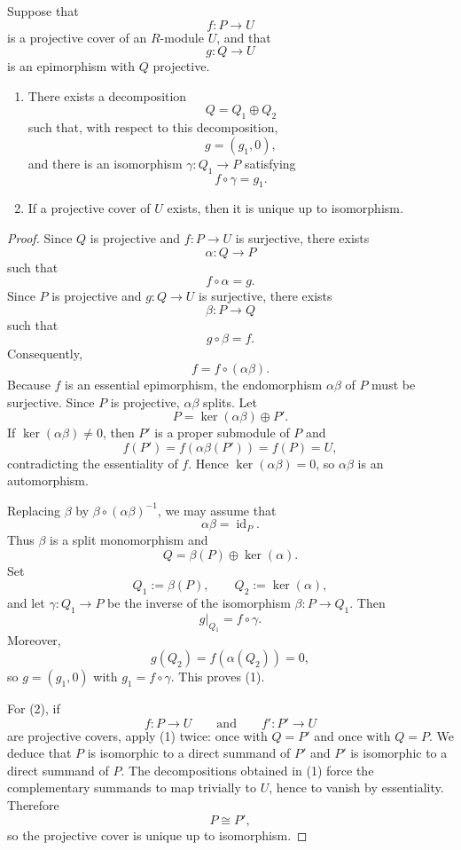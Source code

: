 \begin{proposition}
    Suppose that
    \[
        f:P\to U
    \]
    is a projective cover of an $R$-module $U$, and that
    \[
        g:Q\to U
    \]
    is an epimorphism with $Q$ projective.
    \begin{enumerate}
        \item There exists a decomposition
              \[
                  Q=Q_1\oplus Q_2
              \]
              such that, with respect to this decomposition,
              \[
                  g=(g_1,0),
              \]
              and there is an isomorphism $\gamma:Q_1\to P$ satisfying
              \[
                  f\circ \gamma=g_1.
              \]
        \item If a projective cover of $U$ exists, then it is unique up to
              isomorphism.
    \end{enumerate}
\end{proposition}

\begin{proof}
    Since $Q$ is projective and $f:P\to U$ is surjective, there exists
    \[
        \alpha:Q\to P
    \]
    such that
    \[
        f\circ \alpha=g.
    \]
    Since $P$ is projective and $g:Q\to U$ is surjective, there exists
    \[
        \beta:P\to Q
    \]
    such that
    \[
        g\circ \beta=f.
    \]
    Consequently,
    \[
        f=f\circ (\alpha\beta).
    \]
    Because $f$ is an essential epimorphism, the endomorphism $\alpha\beta$ of $P$ must
    be surjective. Since $P$ is projective, $\alpha\beta$ splits. Let
    \[
        P=\ker(\alpha\beta)\oplus P'.
    \]
    If $\ker(\alpha\beta)\neq 0$, then $P'$ is a proper submodule of $P$ and
    \[
        f(P')=f(\alpha\beta(P'))=f(P)=U,
    \]
    contradicting the essentiality of $f$. Hence $\ker(\alpha\beta)=0$, so $\alpha\beta$ is an automorphism.

    Replacing $\beta$ by $\beta\circ (\alpha\beta)^{-1}$, we may assume that
    \[
        \alpha\beta=\operatorname{id}_P.
    \]
    Thus $\beta$ is a split monomorphism and
    \[
        Q=\beta(P)\oplus \ker(\alpha).
    \]
    Set
    \[
        Q_1:=\beta(P),
        \qquad
        Q_2:=\ker(\alpha),
    \]
    and let $\gamma:Q_1\to P$ be the inverse of the isomorphism $\beta:P\to Q_1$.
    Then
    \[
        g|_{Q_1}=f\circ \gamma.
    \]
    Moreover,
    \[
        g(Q_2)=f(\alpha(Q_2))=0,
    \]
    so $g=(g_1,0)$ with $g_1=f\circ \gamma$. This proves (1).

    For (2), if
    \[
        f:P\to U
        \qquad\text{and}\qquad
        f':P'\to U
    \]
    are projective covers, apply (1) twice: once with $Q=P'$ and once with $Q=P$. We
    deduce that $P$ is isomorphic to a direct summand of $P'$ and $P'$ is isomorphic to a
    direct summand of $P$. The decompositions obtained in (1) force the complementary
    summands to map trivially to $U$, hence to vanish by essentiality. Therefore
    \[
        P\cong P',
    \]
    so the projective cover is unique up to isomorphism.
\end{proof}

